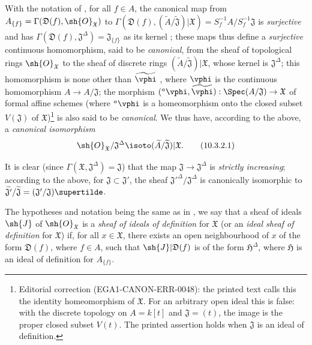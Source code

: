 \begin{env}[10.3.2]
\label{I.10.3.2}
With the notation of , for all $f\in A$, the canonical map from $A_{\{f\}}=\Gamma(\mathfrak{D}(f),\sh{O}_\mathfrak{X})$ to $\Gamma(\mathfrak{D}(f),(\widetilde{A}/\widetilde{\mathfrak{J}})|\mathfrak{X})=S_f^{-1}A/S_f^{-1}\mathfrak{J}$ is \emph{surjective} and has $\Gamma(\mathfrak{D}(f),\mathfrak{J}^\Delta)=\mathfrak{J}_{\{f\}}$ as its kernel ; these maps thus define a \emph{surjective} continuous homomorphism, said to be \emph{canonical}, from the sheaf of topological rings $\sh{O}_\mathfrak{X}$ to the sheaf of discrete rings $(\widetilde{A}/\widetilde{\mathfrak{J}})|\mathfrak{X}$, whose kernel is $\mathfrak{J}^\Delta$; this homomorphism is none other than $\widetilde{\vphi}$ , where $\vphi$ is the continuous homomorphism $A\to A/\mathfrak{J}$; the morphism $({}^a\vphi,\widetilde{\vphi}):\Spec(A/\mathfrak{J})\to\mathfrak{X}$ of formal affine schemes (where ${}^a\vphi$ is a homeomorphism onto the closed subset $V(\mathfrak{J})$ of $\mathfrak{X}$)\footnote{Editorial correction (EGA1-CANON-ERR-0048): the printed text calls this the identity homeomorphism of $\mathfrak{X}$. For an arbitrary open ideal this is false: with the discrete topology on $A=k[t]$ and $\mathfrak{J}=(t)$, the image is the proper closed subset $V(t)$. The printed assertion holds when $\mathfrak{J}$ is an ideal of definition.} is also said to be \emph{canonical}.
We thus have, according to the above, a \emph{canonical isomorphism}
\[
\label{I.10.3.2.1}
  \sh{O}_\mathfrak{X}/\mathfrak{J}^\Delta\isoto(\widetilde{A}/\widetilde{\mathfrak{J}})|\mathfrak{X}.
  \tag{10.3.2.1}
\]

It is clear (since $\Gamma(\mathfrak{X},\mathfrak{J}^\Delta)=\mathfrak{J}$) that the map $\mathfrak{J}\to\mathfrak{J}^\Delta$ is \emph{strictly increasing}; according to the above, for $\mathfrak{J}\subset\mathfrak{J}'$, the sheaf ${\mathfrak{J}'}^\Delta/\mathfrak{J}^\Delta$ is canonically isomorphic to $\widetilde{\mathfrak{J}'}/\widetilde{\mathfrak{J}}=(\mathfrak{J}'/\mathfrak{J})\supertilde$.
\end{env}

\begin{env}[10.3.3]
\label{I.10.3.3}
The hypotheses and notation being the same as in , we say that a sheaf of ideals $\sh{J}$ of $\sh{O}_\mathfrak{X}$ is a \emph{sheaf of ideals of definition} for $\mathfrak{X}$ (or an \emph{ideal sheaf of definition} for $\mathfrak{X}$) if, for all $x\in\mathfrak{X}$, there exists an open neighbourhood of $x$ of the form $\mathfrak{D}(f)$, where $f\in A$, such that $\sh{J}|\mathfrak{D}(f)$ is of the form $\mathfrak{H}^\Delta$, where $\mathfrak{H}$ is an ideal of definition for $A_{\{f\}}$.
\end{env}

